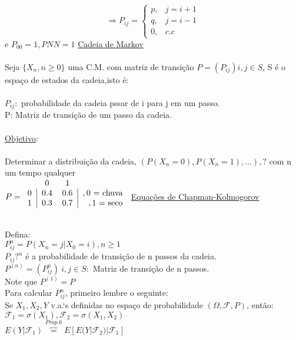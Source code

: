 \documentclass[a4paper,12pt]{article}
\begin{document}
\begin{equation*}
\Rightarrow P_{ij}=
\begin{cases}
p, & j=i+1\\
q, & j=i-1\\
0, & c.c
\end{cases}
\end{equation*}
e $P_{00}=1,P{NN}=1$
\newpage
\underline{Cadeia de Markov}\\
\\
Seja $\{X_n,n\ge0 \}$ uma C.M. com matriz de transição $P=(P_{ij}) i,j\in S$, S é o espaço de estados da cadeia,isto é:\\
\\
$P_{ij}:$ probabilidade da cadeia pssar de i para j em um passo.\\
P: Matriz de transição de um passo da cadeia.\\
\\
\underline{Objetivo}:\\
\\
Determinar a distribuição da cadeia, $\left(P(X_n=0),P(X_n=1),...\right),?$ com n um tempo qualquer
\\
$
P = 
\begin{blockarray}{cccc}
	&  0   & 1   \\
	\begin{block}{r|rr|r}
		0 & 0.4 & 0.6 & ,\text{0 = chuva} \\
		1 & 0.3 & 0.7  & ,\text{1 = seco} \\	  
	\end{block}
\end{blockarray}
$
\newpage
\underline{Equações de Chapman-Kolmogorov}\\
\\
Defina:
\\
$P_{ij}^n=P(X_n=j|X_0=i),n\ge 1$\\
$P_{ij}?^n$ é a probabilidade de transição de n passos da cadeia.\\
$P^{(n)}=(P_{ij}^n)\ i,j \in S:$ Matriz de transição de n passos.\\
Note que $P^{(1)}=P$\\
Para calcular $P_{ij}^n$, primeiro lembre o seguinte:\\
Se $X_1,X_2,Y$ v.a.`s definidas no espaço de probabilidade $(\Omega,\mathscr{F},P)$, então:\\
$\mathscr{F}_1=\sigma(X_1),\mathscr{F}_2=\sigma(X_1,X_2)$ \\
$E(Y|\mathscr{F}_1)\overbrace{=}^{Prop.6} E[E(Y|\mathscr{F}_2)|\mathscr{F}_1]$\\
\end{document}
